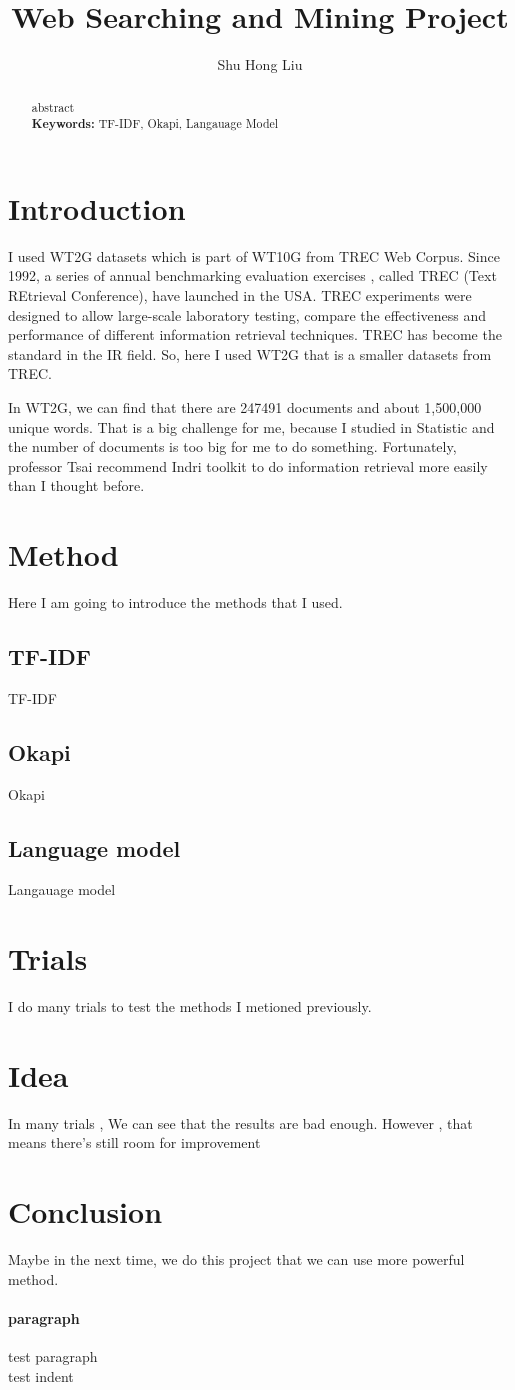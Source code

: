 \documentclass[a4pper,11pt,onecolumn]{article}
\title{Web Searching and Mining Project }
\author{Shu Hong Liu}
\begin{document}
\maketitle
\begin{abstract}
	abstract\\
{\bf Keywords:} TF-IDF, Okapi, Langauage Model
\end{abstract}
\section{Introduction}

I used WT2G datasets which is part of WT10G from TREC Web Corpus.
Since 1992, a series of annual benchmarking evaluation exercises , called TREC (Text REtrieval Conference), have launched in the USA. TREC experiments were designed to allow large-scale laboratory testing, compare the effectiveness and performance of different information retrieval techniques. TREC has become the standard in the IR field. So, here I used WT2G that is a smaller datasets from TREC.

In WT2G, we can find that there are 247491 documents and about 1,500,000 unique words. That is a big challenge for me, because I studied in Statistic and the number of documents is too big for me to do something. Fortunately, professor Tsai recommend Indri toolkit to do information retrieval more easily than I thought before.
\section{Method}
Here I am going to introduce the methods that I used.
\subsection{TF-IDF}
TF-IDF
\subsection{Okapi}
Okapi
\subsection{Language model}
Langauage model
\section{Trials}
I do many trials to test the methods I metioned previously.
\section{Idea}
In many trials , We can see that the results are bad enough. However , that means there's still room for improvement
\section{Conclusion}
Maybe in the next time, we do this project that we can use more powerful method.
\paragraph{paragraph}
 test paragraph
\\\indent test indent
\end{document}
